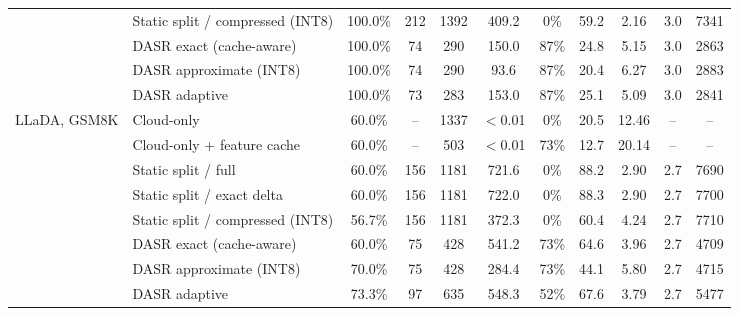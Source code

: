 \begin{table}[t]
{\begin{tabular}{llccccccccc}
 & Static split / compressed (INT8) & 100.0\% & 212 & 1392 & 409.2 & 0\% & 59.2 & 2.16 & 3.0 & 7341 \\
 & DASR exact (cache-aware) & 100.0\% & 74 & 290 & 150.0 & 87\% & 24.8 & 5.15 & 3.0 & 2863 \\
 & DASR approximate (INT8) & 100.0\% & 74 & 290 & 93.6 & 87\% & 20.4 & 6.27 & 3.0 & 2883 \\
 & DASR adaptive & 100.0\% & 73 & 283 & 153.0 & 87\% & 25.1 & 5.09 & 3.0 & 2841 \\
\midrule
LLaDA, GSM8K & Cloud-only & 60.0\% & -- & 1337 & $<$0.01 & 0\% & 20.5 & 12.46 & -- & -- \\
 & Cloud-only + feature cache & 60.0\% & -- & 503 & $<$0.01 & 73\% & 12.7 & 20.14 & -- & -- \\
 & Static split / full & 60.0\% & 156 & 1181 & 721.6 & 0\% & 88.2 & 2.90 & 2.7 & 7690 \\
 & Static split / exact delta & 60.0\% & 156 & 1181 & 722.0 & 0\% & 88.3 & 2.90 & 2.7 & 7700 \\
 & Static split / compressed (INT8) & 56.7\% & 156 & 1181 & 372.3 & 0\% & 60.4 & 4.24 & 2.7 & 7710 \\
 & DASR exact (cache-aware) & 60.0\% & 75 & 428 & 541.2 & 73\% & 64.6 & 3.96 & 2.7 & 4709 \\
 & DASR approximate (INT8) & 70.0\% & 75 & 428 & 284.4 & 73\% & 44.1 & 5.80 & 2.7 & 4715 \\
 & DASR adaptive & 73.3\% & 97 & 635 & 548.3 & 52\% & 67.6 & 3.79 & 2.7 & 5477 \\
\bottomrule
\end{tabular}}
\end{table}